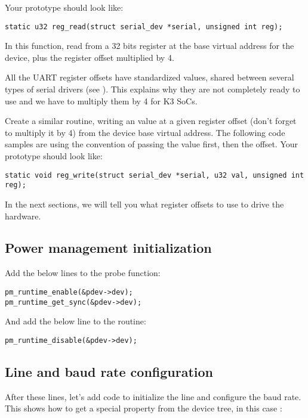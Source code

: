 Your prototype should look like:
\begin{verbatim}
static u32 reg_read(struct serial_dev *serial, unsigned int reg);
\end{verbatim}

In this function, read from a 32 bits register at the base virtual
address for the device, plus the register offset multiplied by 4.

All the UART register offsets have standardized values, shared between
several types of serial drivers (see
). This explains why they are not
completely ready to use and we have to multiply them by 4 for K3 SoCs.

Create a similar  routine, writing an 
value at a given register offset (don't forget to multiply it by 4) from
the device base virtual address. The following code samples are using
the  convention of passing the value first, then the
offset. Your prototype should look like:
\begin{verbatim}
static void reg_write(struct serial_dev *serial, u32 val, unsigned int reg);
\end{verbatim}

In the next sections, we will tell you what register offsets to use
to drive the hardware.

\subsection{Power management initialization}

Add the below lines to the probe function:

\begin{verbatim}
pm_runtime_enable(&pdev->dev);
pm_runtime_get_sync(&pdev->dev);
\end{verbatim}

And add the below line to the  routine:

\begin{verbatim}
pm_runtime_disable(&pdev->dev);
\end{verbatim}

\subsection{Line and baud rate configuration}

After these lines, let's add code to initialize the line
and configure the baud rate. This shows how to get a special
property from the device tree, in this case :

